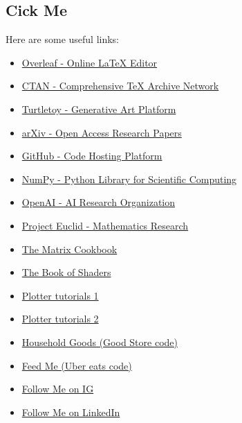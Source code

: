 \subsection{Cick Me}

Here are some useful links:

\begin{itemize}
    \item \href{https://www.overleaf.com}{Overleaf - Online LaTeX Editor}
    \item \href{https://www.ctan.org}{CTAN - Comprehensive TeX Archive Network}
    \item \href{https://turtletoy.net}{Turtletoy - Generative Art Platform}
    \item \href{https://arxiv.org}{arXiv - Open Access Research Papers}
    \item \href{https://github.com}{GitHub - Code Hosting Platform}
    \item \href{https://numpy.org}{NumPy - Python Library for Scientific Computing}
    \item \href{https://openai.com}{OpenAI - AI Research Organization}
    \item \href{https://projecteuclid.org}{Project Euclid - Mathematics Research}
    \item \href{https://www.math.uwaterloo.ca/~hwolkowi/matrixcookbook.pdf}{The Matrix Cookbook}
    \item \href{https://thebookofshaders.com/}{The Book of Shaders}
    \item \href{https://github.com/beardicus/awesome-plotters}{Plotter tutorials 1}
    \item \href{https://www.generativehut.com/tutorials}{Plotter tutorials 2}

    \item \href{https://oken.do/ggmh4kmj}{Household Goods (Good Store code)}
    \item \href{https://ubereats.com/feed?promoCode=eats-i81xs}{Feed Me (Uber eats code)}
    \item \href{https://www.instagram.com/chromatocosmos/}{Follow Me on IG}
    \item \href{https://www.linkedin.com/in/geoffrey-bradway/}{Follow Me on LinkedIn}
    
\end{itemize}

